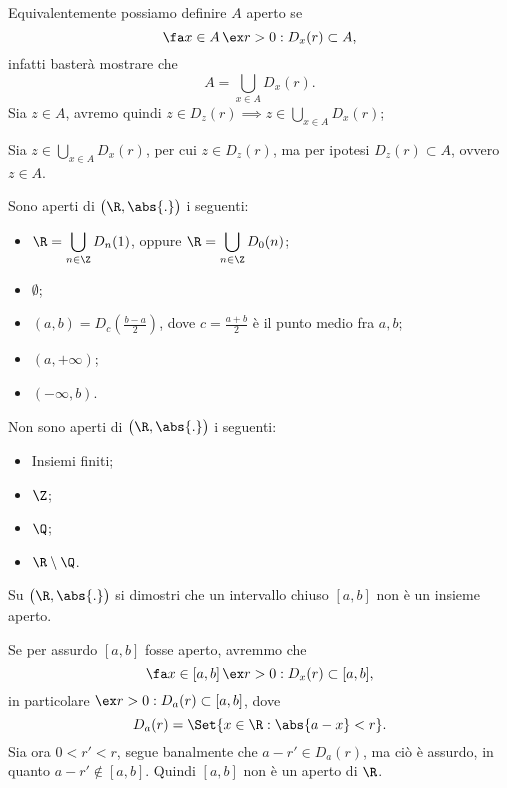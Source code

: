 \begin{oss}
    Equivalentemente possiamo definire $A$ aperto se
    \[
        \fa x\in A\,\ex r>0:D_x(r)\subset A,
    \]
    infatti basterà mostrare che
    \[
        A=\bigcup_{x\in A}D_x(r).
    \]
    \graffito{$\subseteq$}Sia $z\in A$, avremo quindi $z\in D_z(r)\implies z\in\bigcup_{x\in A}D_x(r)$;

    \graffito{$\supseteq$}Sia $z\in\bigcup_{x\in A}D_x(r)$, per cui $z\in D_z(r)$, ma per ipotesi $D_z(r)\subset A$, ovvero $z\in A$.
\end{oss}

\begin{ese}
    Sono aperti di $\big(\R,\abs{.}\big)$ i seguenti:
    \begin{itemize}
        \item $\displaystyle{\R=\bigcup_{n\in \Z} D_n(1)}$, oppure $\displaystyle{\R=\bigcup_{n\in \Z} D_0(n)}$;
        \item $\emptyset$;
        \item $(a,b)=D_c(\frac{b-a}{2})$, dove $c=\frac{a+b}{2}$ è il punto medio fra $a,b$;
        \item $(a,+\infty)$;
        \item $(-\infty,b)$.
    \end{itemize}
\end{ese}

\begin{ese}
    Non sono aperti di $\big(\R,\abs{.}\big)$ i seguenti:
    \begin{itemize}
        \item Insiemi finiti;
        \item $\Z$;
        \item $\Q$;
        \item $\R\setminus\Q$.
    \end{itemize}
\end{ese}

\begin{exe}
    Su $\big(\R,\abs{.}\big)$ si dimostri che un intervallo chiuso $[a,b]$ non è un insieme aperto.
\end{exe}

\begin{sol}
    Se per assurdo $[a,b]$ fosse aperto, avremmo che
    \[
        \fa x\in [a,b]\,\ex r>0:D_x(r)\subset [a,b],
    \]
    in particolare $\ex r>0:D_a(r)\subset [a,b]$, dove
    \[
        D_a(r)=\Set{x\in\R : \abs{a-x}<r}.
    \]
    Sia ora $0<r'<r$, segue banalmente che $a-r'\in D_a(r)$, ma ciò è assurdo, in quanto $a-r'\notin [a,b]$.
    Quindi $[a,b]$ non è un aperto di $\R$.
\end{sol}

